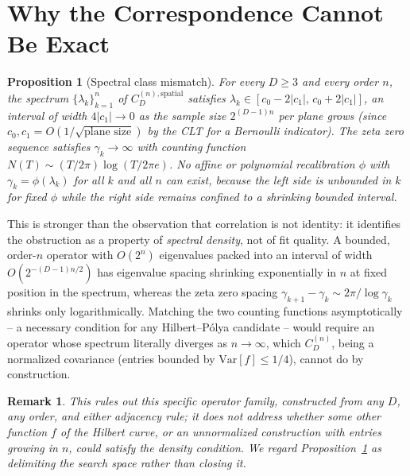 \documentclass[11pt,a4paper]{article}
\newtheorem{proposition}{Proposition}
\newtheorem{remark}{Remark}
\begin{document}
\section{Why the Correspondence Cannot Be Exact}
\label{sec:obstruction}

\begin{proposition}[Spectral class mismatch]
\label{prop:mismatch}
For every $D\ge3$ and every order $n$, the spectrum
$\{\lambda_k\}_{k=1}^n$ of $C_D^{(n),\mathrm{spatial}}$ satisfies
$\lambda_k \in [c_0-2|c_1|,\,c_0+2|c_1|]$, an interval of width
$4|c_1|\to 0$ as the sample size $2^{(D-1)n}$ per plane grows (since
$c_0,c_1 = O(1/\sqrt{\text{plane size}})$ by the CLT for a Bernoulli
indicator). The zeta zero sequence satisfies $\gamma_k \to \infty$ with
counting function $N(T)\sim(T/2\pi)\log(T/2\pi e)$. No affine or
polynomial recalibration $\phi$ with $\gamma_k = \phi(\lambda_k)$ for all
$k$ and all $n$ can exist, because the left side is unbounded in $k$ for
fixed $\phi$ while the right side remains confined to a shrinking bounded
interval.
\end{proposition}

This is stronger than the observation that correlation is not identity: it
identifies the obstruction as a property of \emph{spectral density}, not of
fit quality. A bounded, order-$n$ operator with $O(2^n)$ eigenvalues packed
into an interval of width $O(2^{-(D-1)n/2})$ has eigenvalue spacing
shrinking exponentially in $n$ at fixed position in the spectrum, whereas
the zeta zero spacing $\gamma_{k+1}-\gamma_k \sim 2\pi/\log\gamma_k$ shrinks
only logarithmically. Matching the two counting functions asymptotically --
a necessary condition for any Hilbert--P\'{o}lya candidate -- would require
an operator whose spectrum literally diverges as $n\to\infty$, which
$C_D^{(n)}$, being a normalized covariance (entries bounded by
$\mathrm{Var}[f]\le 1/4$), cannot do by construction.

\begin{remark}
This rules out this specific operator family, constructed from any
$D$, any order, and either adjacency rule; it does not address whether some
other function $f$ of the Hilbert curve, or an unnormalized construction
with entries growing in $n$, could satisfy the density condition. We regard
Proposition~\ref{prop:mismatch} as delimiting the search space rather than
closing it.
\end{remark}
\end{document}
